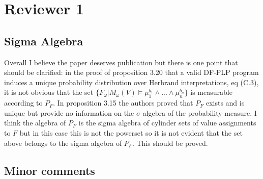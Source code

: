 \section{Reviewer 1}


\subsection{Sigma Algebra}
Overall I believe the paper deserves publication but there is one point that should be clarified: in the proof of
proposition 3.20 that a valid DF-PLP program induces a unique probability distribution over Herbrand interpretations,
eq (C.3), it is not obvious that the set $\{F_\omega|M_\omega(V)\models \mu_1^{b_1} \wedge ... \wedge \mu_n^{b_n}\}$ is
measurable according to $P_F$. In proposition 3.15 the authors proved that $P_F$ exists and is unique but provide no
information on the $\sigma$-algebra of the probability measure. I think the algebra of $P_F$ is the sigma algebra of
cylinder sets of value assignments to $F$ but in this case this is not the powerset so it is not evident that
the set above belongs to the sigma algebra of $P_F$. This should be proved.


\subsection{Minor comments}

